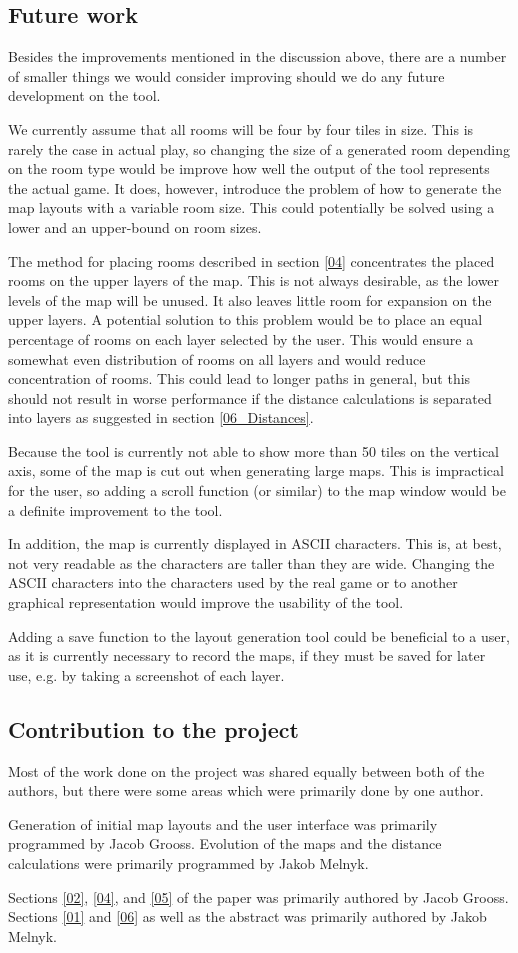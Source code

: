 \subsection{Future work}
Besides the improvements mentioned in the discussion above, there are a number of smaller things we would consider improving should we do any future development on the tool.

We currently assume that all rooms will be four by four tiles in size. This is rarely the case in actual play, so changing the size of a generated room depending on the room type would be improve how well the output of the tool represents the actual game. It does, however, introduce the problem of how to generate the map layouts with a variable room size. This could potentially be solved using a lower and an upper-bound on room sizes.

The method for placing rooms described in section \ref{04} concentrates the placed rooms on the upper layers of the map. This is not always desirable, as the lower levels of the map will be unused. It also leaves little room for expansion on the upper layers. A potential solution to this problem would be to place an equal percentage of rooms on each layer selected by the user. This would ensure a somewhat even distribution of rooms on all layers and would reduce concentration of rooms. This could lead to longer paths in general, but this should not result in worse performance if the distance calculations is separated into layers as suggested in section \ref{06_Distances}.

Because the tool is currently not able to show more than 50 tiles on the vertical axis, some of the map is cut out when generating large maps. This is impractical for the user, so adding a scroll function (or similar) to the map window would be a definite improvement to the tool.

In addition, the map is currently displayed in ASCII characters. This is, at best, not very readable as the characters are taller than they are wide. Changing the ASCII characters into the characters used by the real game or to another graphical representation would improve the usability of the tool.

Adding a save function to the layout generation tool could be beneficial to a user, as it is currently necessary to record the maps, if they must be saved for later use, e.g. by taking a screenshot of each layer.

\subsection{Contribution to the project}
Most of the work done on the project was shared equally between both of the authors, but there were some areas which were primarily done by one author.

Generation of initial map layouts and the user interface was primarily programmed by Jacob Grooss. Evolution of the maps and the distance calculations were primarily programmed by Jakob Melnyk.

Sections \ref{02}, \ref{04}, and \ref{05} of the paper was primarily authored by Jacob Grooss.  Sections \ref{01} and \ref{06} as well as the abstract was primarily authored by Jakob Melnyk.